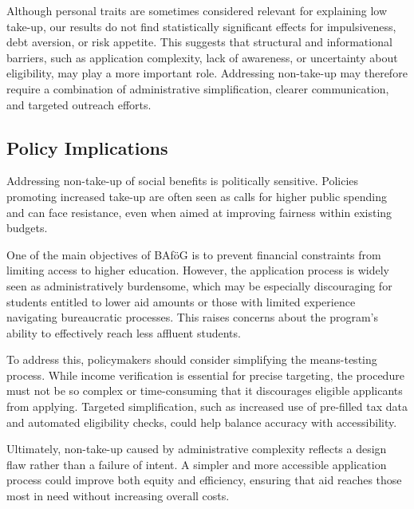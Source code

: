 Although personal traits are sometimes considered relevant for explaining low take-up, our results do not find statistically significant effects for impulsiveness, debt aversion, or risk appetite. 
This suggests that structural and informational barriers, such as application complexity, lack of awareness, or uncertainty about eligibility, may play a more important role. 
Addressing non-take-up may therefore require a combination of administrative simplification, clearer communication, and targeted outreach efforts.

\subsection{Policy Implications}

Addressing non-take-up of social benefits is politically sensitive. 
Policies promoting increased take-up are often seen as calls for higher public spending and can face resistance, even when aimed at improving fairness within existing budgets.

One of the main objectives of BAföG is to prevent financial constraints from limiting access to higher education. 
However, the application process is widely seen as administratively burdensome, which may be especially discouraging for students entitled to lower aid amounts or those with limited experience navigating bureaucratic processes.
This raises concerns about the program’s ability to effectively reach less affluent students.

To address this, policymakers should consider simplifying the means-testing process. 
While income verification is essential for precise targeting, the procedure must not be so complex or time-consuming that it discourages eligible applicants from applying. 
Targeted simplification, such as increased use of pre-filled tax data and automated eligibility checks, could help balance accuracy with accessibility.

Ultimately, non-take-up caused by administrative complexity reflects a design flaw rather than a failure of intent. 
A simpler and more accessible application process could improve both equity and efficiency, ensuring that aid reaches those most in need without increasing overall costs.
